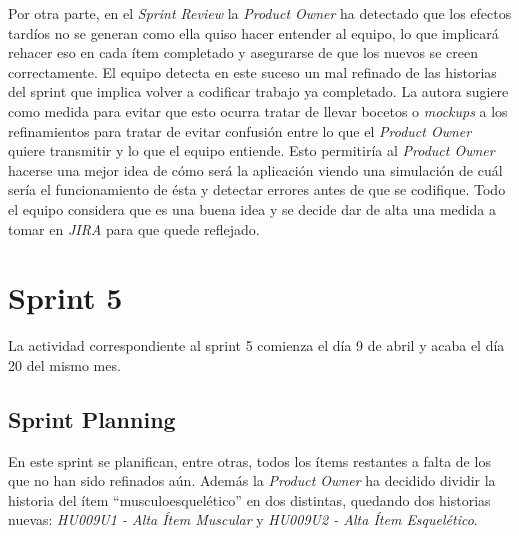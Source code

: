 Por otra parte, en el \emph{Sprint Review} la \emph{Product Owner} ha detectado que los efectos tardíos no se generan como ella quiso hacer entender al equipo, lo que implicará rehacer eso en cada ítem completado y asegurarse de que los nuevos se creen correctamente. El equipo detecta en este suceso un mal refinado de las historias del sprint que implica volver a codificar trabajo ya completado. La autora sugiere como medida para evitar que esto ocurra tratar de llevar bocetos o \emph{mockups} a los refinamientos para tratar de evitar confusión entre lo que el \emph{Product Owner} quiere transmitir y lo que el equipo entiende. Esto permitiría al \emph{Product Owner} hacerse una mejor idea de cómo será la aplicación viendo una simulación de cuál sería el funcionamiento de ésta y detectar errores antes de que se codifique. Todo el equipo considera que es una buena idea y se decide dar de alta una medida a tomar en \emph{JIRA} para que quede reflejado.




\section{Sprint 5}
\label{sec:sprint5}

La actividad correspondiente al sprint 5 comienza el día 9 de abril y acaba el día 20 del mismo mes.

\subsection{Sprint Planning}
\label{subsec:S5-SP}


En este sprint se planifican, entre otras, todos los ítems restantes a falta de los que no han sido refinados aún. Además la \emph{Product Owner} ha decidido dividir la historia del ítem ``musculoesquelético'' en dos distintas, quedando dos historias nuevas: \emph{HU009U1 - Alta Ítem Muscular} y \emph{HU009U2 - Alta Ítem Esquelético}.

